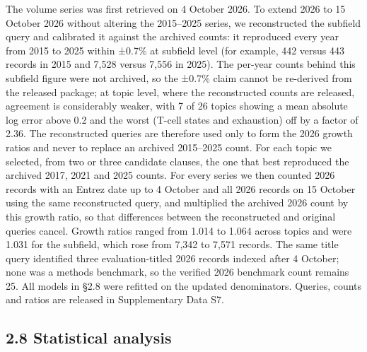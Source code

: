 \documentclass[11pt]{article}
\begin{document}
The volume series was first retrieved on 4 October 2026. To extend 2026
to 15 October 2026 without altering the 2015--2025 series, we
reconstructed the subfield query and calibrated it against the archived
counts: it reproduced every year from 2015 to 2025 within ±0.7\% at
subfield level (for example, 442 versus 443 records in 2015 and 7,528
versus 7,556 in 2025). The per-year counts behind this subfield figure
were not archived, so the ±0.7\% claim cannot be re-derived from the
released package; at topic level, where the reconstructed counts are
released, agreement is considerably weaker, with 7 of 26 topics showing
a mean absolute log error above 0.2 and the worst (T-cell states and
exhaustion) off by a factor of 2.36. The reconstructed queries are
therefore used only to form the 2026 growth ratios and never to replace
an archived 2015--2025 count. For each topic we selected, from two or
three candidate clauses, the one that best reproduced the archived 2017,
2021 and 2025 counts. For every series we then counted 2026 records with
an Entrez date up to 4 October and all 2026 records on 15 October using
the same reconstructed query, and multiplied the archived 2026 count by
this growth ratio, so that differences between the reconstructed and
original queries cancel. Growth ratios ranged from 1.014 to 1.064 across
topics and were 1.031 for the subfield, which rose from 7,342 to 7,571
records. The same title query identified three evaluation-titled 2026
records indexed after 4 October; none was a methods benchmark, so the
verified 2026 benchmark count remains 25. All models in §2.8 were
refitted on the updated denominators. Queries, counts and ratios are
released in Supplementary Data S7.

\subsection{2.8 Statistical analysis}\label{statistical-analysis}
\end{document}
